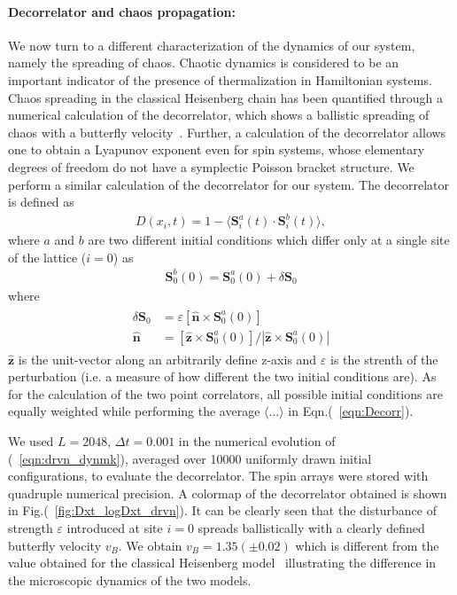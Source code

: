 \documentclass[prl,aps,twocolumn,nosuperscriptaddress,bibnotes,notitlepage,nofootinbib]{revtex4-2}
\newcommand{\spin}{\mathbf{S}}
\begin{document}
\paragraph{Decorrelator and chaos propagation:}
We now turn to a different characterization of the dynamics of our system, namely the spreading of chaos. Chaotic dynamics is considered to be an important indicator of the presence of thermalization in Hamiltonian systems. Chaos spreading in the classical Heisenberg chain has been quantified through a numerical calculation of the decorrelator, which shows a ballistic spreading of chaos with a butterfly velocity~\cite{das2018light}. Further, a calculation of the decorrelator allows one to obtain a Lyapunov exponent even for spin systems, whose elementary degrees of freedom do not have a symplectic Poisson bracket structure. We perform a similar calculation of the decorrelator for our system. The decorrelator is defined as
\begin{align}
    D( x_i, t) = 1- \langle \spin_i^{a}( t)\cdot \spin_i^{b}( t) \rangle,
    \label{eqn:Decorr}
\end{align} 
where $a$ and $b$ are two different initial conditions which differ only at a single site of the lattice ($i=0$) as 
\begin{align*}
\spin^{b}_0(0) = \spin^{a}_0(0) + \delta \spin_0
\end{align*} 
where
\begin{align}
\begin{split}
\delta \spin_0 &= \varepsilon[\hat{\mathbf{n}} \times \spin^a_0(0)] \\
\hat{\mathbf{n}} &= [\hat{\mathbf{z}} \times \spin^a_0(0)]/|\hat{\mathbf{z}} \times \spin^a_0(0)|
\end{split}
\label{eqn:Epsilonchange}
\end{align}
$\hat{\mathbf{z}}$ is the unit-vector along an arbitrarily define z-axis and $\varepsilon$ is the strenth of the perturbation (i.e. a measure of how different the two initial conditions are). As for the calculation of the two point correlators, all possible initial conditions are equally weighted while performing the average $\langle \dots \rangle$ in Eqn.(~\ref{eqn:Decorr}). 

We used $L=2048$, $\Delta t = 0.001$ in the numerical evolution of (~\ref{eqn:drvn_dynmk}), averaged over 10000 uniformly drawn initial configurations, to evaluate the decorrelator. The spin arrays were stored with quadruple numerical precision.  A colormap of the decorrelator obtained is shown in Fig.(~\ref{fig:Dxt_logDxt_drvn}). It can be clearly seen that the disturbance of strength $\varepsilon$ introduced at site $i=0$ spreads ballistically with a clearly defined butterfly velocity $v_B$. We obtain $v_B = 1.35(\pm 0.02) $ which is different from the value obtained for the classical Heisenberg model~\cite{das2018light} illustrating the difference in the microscopic dynamics of the two models.     
\end{document}
